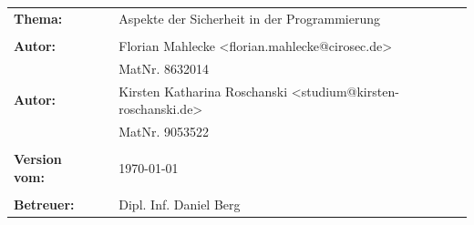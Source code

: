 \begin{verbatim}






\end{verbatim}
\begin{flushleft}
\begin{tabular}{llll}
\textbf{Thema:} & & Aspekte der Sicherheit in der Programmierung & \\
& & \\
\textbf{Autor:} & & Florian Mahlecke <florian.mahlecke@cirosec.de>& \\
& & MatNr. 8632014 & \\
\textbf{Autor:} & & Kirsten Katharina Roschanski <studium@kirsten-roschanski.de>& \\
& & MatNr. 9053522 & \\
& & \\
\textbf{Version vom:} & & \today &\\
& & \\
\textbf{Betreuer:} & & Dipl. Inf. Daniel Berg &\\
\end{tabular}
\end{flushleft}
